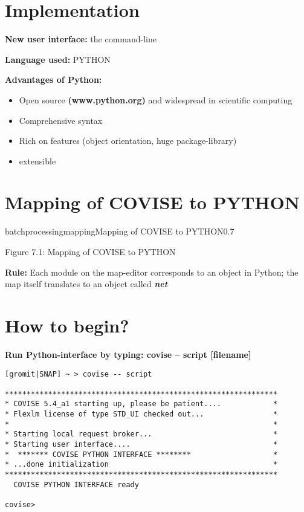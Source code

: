 \section{Implementation}

{\bf New user interface:} the command-line \newline \newline

{\bf Language used:} PYTHON \newline \newline

{\bf Advantages of Python:}
\begin{itemize}
\item Open source {\bf (www.python.org)} and widespread in scientific computing
\item Comprehensive syntax
\item Rich on features (object orientation, huge package-library)
\item extensible
\end{itemize}
\clearpage
\section{Mapping of COVISE to PYTHON}

\begin{covimg}{batchprocessing}{mapping}{Mapping of COVISE to PYTHON}{0.7}\end{covimg}
\begin{htmlonly}
Figure 7.1: Mapping of COVISE to PYTHON
\vspace{0.5cm}
\end{htmlonly}


{\bf Rule:} Each module on the map-editor corresponds to an object 
	     in Python; the map itself translates to an object called 
	     \textit{\textbf{net}}

\clearpage

\section{How to begin?}

{\bf Run Python-interface by typing: covise -- script [filename]}

\begin{verbatim}
[gromit|SNAP] ~ > covise -- script

***************************************************************
* COVISE 5.4_a1 starting up, please be patient....            *
* Flexlm license of type STD_UI checked out...                *
*                                                             *
* Starting local request broker...                            *
* Starting user interface....                                 *
*  ******* COVISE PYTHON INTERFACE ********                   *
* ...done initialization                                      *
***************************************************************
  COVISE PYTHON INTERFACE ready

covise>
\end{verbatim}

